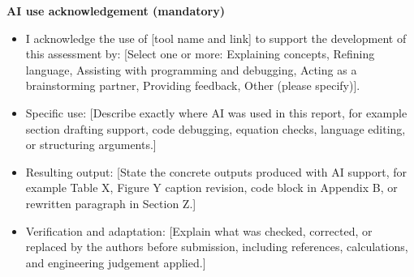 \documentclass[11pt,a4paper]{article}
\begin{document}
\textbf{AI use acknowledgement (mandatory)}
\begin{itemize}
    \item I acknowledge the use of [tool name and link] to support the development of this assessment by: [Select one or more: Explaining concepts, Refining language, Assisting with programming and debugging, Acting as a brainstorming partner, Providing feedback, Other (please specify)].
    \item Specific use: [Describe exactly where AI was used in this report, for example section drafting support, code debugging, equation checks, language editing, or structuring arguments.]
    \item Resulting output: [State the concrete outputs produced with AI support, for example Table X, Figure Y caption revision, code block in Appendix B, or rewritten paragraph in Section Z.]
    \item Verification and adaptation: [Explain what was checked, corrected, or replaced by the authors before submission, including references, calculations, and engineering judgement applied.]
\end{itemize}
\end{document}
